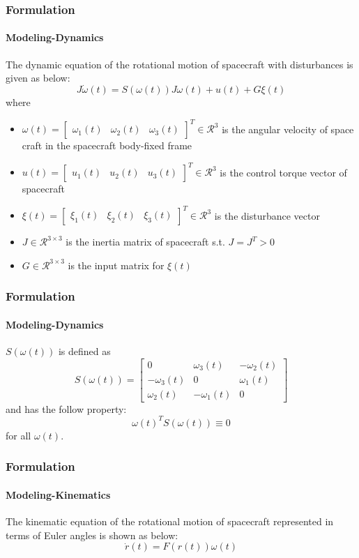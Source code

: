 \documentclass{beamer}
\begin{document}
\begin{frame}
\frametitle{Formulation}
\framesubtitle{Modeling-Dynamics}
The dynamic equation of the rotational motion of spacecraft with disturbances is given as below:
\begin{equation} \label{Dynamics}
J{\dot{\omega}(t)}=S(\omega(t))J\omega(t)+u(t)+G\xi(t)
\end{equation}
where
\begin{itemize}
	\item $\omega(t)=\begin{bmatrix}
	\omega_{1}(t)&\omega_{2}(t)&\omega_{3}(t)
	\end{bmatrix}^{T} \in \mathcal{R}^{3}$ is the angular velocity of space craft in the spacecraft body-fixed frame
	\item $u(t)=\begin{bmatrix}
	u_{1}(t)&u_{2}(t)&u_{3}(t)
	\end{bmatrix}^T \in \mathcal{R}^{3}$ is the control torque vector of spacecraft
	\item $\xi(t)=\begin{bmatrix}
	\xi_{1}(t)&\xi_{2}(t)&\xi_{3}(t)
	\end{bmatrix}^T \in \mathcal{R}^{3}$ is the disturbance vector
	\item $J \in \mathcal{R}^{3\times3}$ is the inertia matrix of spacecraft s.t. $J=J^{T}>0$
	\item $G \in \mathcal{R}^{3\times3}$ is the input matrix for $\xi(t)$
\end{itemize}
\end{frame}

\begin{frame}
\frametitle{Formulation}
\framesubtitle{Modeling-Dynamics}
$S(\omega(t))$ is defined as
\begin{equation}
S(\omega(t))=\begin{bmatrix}
0&\omega_{3}(t)&-\omega_{2}(t)\\
-\omega_{3}(t)&0&\omega_{1}(t)\\
\omega_{2}(t)&-\omega_{1}(t)&0
\end{bmatrix}
\end{equation}
and has the follow property:
\begin{equation}\label{sProperty}
\omega(t)^TS(\omega(t))\equiv 0
\end{equation}
for all $\omega(t)$.
\end{frame}

\begin{frame}
\frametitle{Formulation}
\framesubtitle{Modeling-Kinematics}
The kinematic equation of the rotational motion of spacecraft represented in terms of Euler angles is shown as below:
\begin{equation} \label{Kinematics}
\dot{r}(t)=F(r(t))\omega(t)
\end{equation}
\end{frame}
\end{document}
